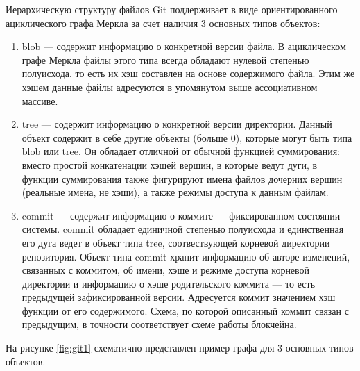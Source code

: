 Иерархическую структуру файлов Git поддерживает в виде ориентированного ациклического графа Меркла за счет наличия 3 основных типов объектов:
\begin{enumerate}
    \item blob --- содержит информацию о конкретной версии файла. В ациклическом графе Меркла файлы этого типа всегда обладают нулевой степенью полуисхода, то есть их хэш составлен на основе содержимого файла. Этим же хэшем данные файлы адресуются в упомянутом выше ассоциативном массиве.
    \item tree --- содержит информацию о конкретной версии директории. Данный объект содержит в себе другие объекты (больше 0), которые могут быть типа blob или tree. Он обладает отличной от обычной функцией суммирования: вместо простой конкатенации хэшей вершин, в которые ведут дуги, в функции суммирования также фигурируют имена файлов дочерних вершин (реальные имена, не хэши), а также режимы доступа к данным файлам.
    \item commit --- содержит информацию о коммите --- фиксированном состоянии системы. commit обладает единичной степенью полуисхода и единственная его дуга ведет в объект типа tree, соотвествующей корневой директории репозитория. Объект типа commit хранит информацию об авторе изменений, связанных с коммитом, об имени, хэше и режиме доступа корневой директории и информацию о хэше родительского коммита --- то есть предыдущей зафиксированной версии. Адресуется коммит значением хэш функции от его содержимого. Схема, по которой описанный коммит связан с предыдущим, в точности соответствует схеме работы блокчейна.
\end{enumerate}

На рисунке \ref{fig:git1} схематично представлен пример графа для 3 основных типов объектов.

